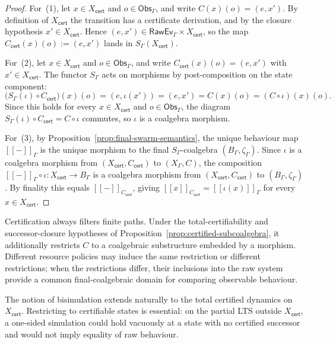 \documentclass[a4paper,fleqn]{cas-sc}
\newcommand{\sem}[1]{\left[\!\left[#1\right]\!\right]}
\newcommand{\Obs}{\mathsf{Obs}}
\newcommand{\cert}{\mathsf{cert}}
\newcommand{\RawEv}{\mathsf{RawEv}}
\begin{document}
\begin{proof}
For~(1), let \(x\in X_{\cert}\) and \(o\in\Obs_{\Gamma}\), and write \(C(x)(o)=(e,x')\). By definition of \(X_{\cert}\) the transition has a certificate derivation, and by the closure hypothesis \(x'\in X_{\cert}\). Hence \((e,x')\in\RawEv_{\Gamma}\times X_{\cert}\), so the map \(C_{\cert}(x)(o):=(e,x')\) lands in \(S_{\Gamma}(X_{\cert})\).

For~(2), let \(x\in X_{\cert}\) and \(o\in\Obs_{\Gamma}\), and write \(C_{\cert}(x)(o)=(e,x')\) with \(x'\in X_{\cert}\). The functor \(S_{\Gamma}\) acts on morphisms by post-composition on the state component:
\[
  \bigl(S_{\Gamma}(\iota)\circ C_{\cert}\bigr)(x)(o)
  =(e,\iota(x'))
  =(e,x')
  =C(x)(o)
  =(C\circ\iota)(x)(o).
\]
Since this holds for every \(x\in X_{\cert}\) and \(o\in\Obs_{\Gamma}\), the diagram \(S_{\Gamma}(\iota)\circ C_{\cert}=C\circ\iota\) commutes, so \(\iota\) is a coalgebra morphism.

For~(3), by Proposition~\ref{prop:final-swarm-semantics}, the unique behaviour map \(\sem{-}_{\Gamma}\) is the unique morphism to the final \(S_{\Gamma}\)-coalgebra \((B_{\Gamma},\zeta_{\Gamma})\). Since \(\iota\) is a coalgebra morphism from \((X_{\cert},C_{\cert})\) to \((X_{\Gamma},C)\), the composition \(\sem{-}_{\Gamma}\circ\iota:X_{\cert}\to B_{\Gamma}\) is a coalgebra morphism from \((X_{\cert},C_{\cert})\) to \((B_{\Gamma},\zeta_{\Gamma})\). By finality this equals \(\sem{-}_{C_{\cert}}\), giving \(\sem{x}_{C_{\cert}}=\sem{\iota(x)}_{\Gamma}\) for every \(x\in X_{\cert}\).
\end{proof}

Certification always filters finite paths. Under the total-certifiability and
successor-closure hypotheses of Proposition~\ref{prop:certified-subcoalgebra},
it additionally restricts \(C\) to a coalgebraic substructure embedded by a
morphism. Different resource policies may induce the same restriction or
different restrictions; when the restrictions differ, their inclusions into
the raw system provide a common final-coalgebraic domain for comparing
observable behaviour.

The notion of bisimulation extends naturally to the total certified dynamics on
\(X_{\cert}\). Restricting to certifiable states is essential: on the partial LTS
outside \(X_{\cert}\), a one-sided simulation could hold vacuously at a state
with no certified successor and would not imply equality of raw behaviour.
\end{document}
